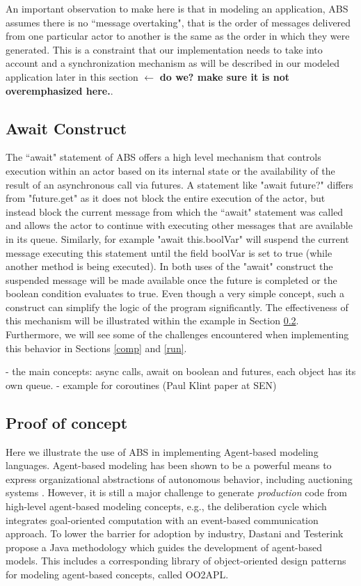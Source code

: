 An important observation to make here is that in modeling an application, ABS assumes there is no ``message overtaking", that is the order of messages delivered from one particular actor to another is the same as the order in which they were generated. 
This is a constraint that our implementation needs to take into account and a synchronization mechanism as will be described in our modeled application later in this section $\leftarrow$ {\bfseries do we? make sure it is not overemphasized here.}. 


\subsection{Await Construct}
The ``await" statement of ABS offers a high level mechanism that controls execution within an actor based on its internal state or the availability of the result of an asynchronous call via futures. A statement like "await future?" differs from "future.get" as it does not block the entire execution of the actor, but instead block the current message from which the ``await" statement was called and allows the actor to continue with executing other messages that are available in its queue. Similarly, for example "await this.boolVar" will suspend the current message executing this statement until the field boolVar is set to true (while another method is being executed). In both uses of the "await" construct the suspended message will be made available once the future is completed or the boolean condition evaluates to true. 
Even though a very simple concept, such a construct can simplify the logic of the program significantly. The effectiveness of this mechanism will be illustrated within the example in Section \ref{ag}. 
Furthermore, we will see some of the challenges encountered when implementing this behavior in Sections \ref{comp} and \ref{run}.        

- the main concepts: async calls, await on boolean and futures, each object has its own queue.
- example for coroutines (Paul Klint paper at SEN)

\subsection{Proof of concept}
\label{ag}
Here we illustrate the use of ABS in implementing Agent-based modeling languages.
Agent-based modeling has been shown to be a powerful means to express organizational abstractions of autonomous behavior, including auctioning systems \cite{agent_auction,bas16}.
However, it is still a major challenge to generate  \emph{production} code from  high-level agent-based modeling concepts, e.g., the deliberation cycle which integrates  goal-oriented computation with an event-based communication approach. 
To lower the barrier for adoption by industry, Dastani and Testerink \cite{bas16} propose a Java methodology which guides the development of agent-based models. 
This includes a corresponding library of object-oriented design patterns for modeling agent-based concepts, called OO2APL. 

